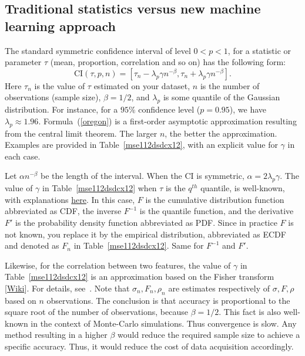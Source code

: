 \documentclass[oneside,10pt]{book}
\begin{document}
\subsection{Traditional statistics versus new machine learning approach}\label{excetp09}

The standard symmetric confidence interval of level $0<p<1$, for a statistic or parameter $\tau$ (mean, proportion, correlation and so on) has the following form:
\begin{equation}
\text{CI}(\tau, p, n) = [\tau_n - \lambda_p \gamma n^{-\beta},  \tau_n + \lambda_p \gamma n^{-\beta}].\label{oregon}
\end{equation}
Here $\tau_n$ is the value of $\tau$ estimated on your dataset, $n$ is the number of observations (sample size),
$\beta = 1/2$, and $\lambda_p$ is some quantile of the Gaussian distribution. For instance, for a $95\%$ confidence level ($p=0.95$),
 we have $\lambda_p \approx 1.96$. Formula~(\ref{oregon}) is a first-order 
\textcolor{index}{asymptotic approximation} resulting from the
 \textcolor{index}{central limit theorem}. The larger $n$, the better the approximation.
 Examples are provided in Table~\ref{mse112dsdcx12}, with an explicit value for $\gamma$ in each case.

Let $\alpha n^{-\beta}$ be the length of the interval. 
When the CI is symmetric, $\alpha = 2\lambda_p \gamma$.
 The value of $\gamma$ in 
 Table~\ref{mse112dsdcx12} when $\tau$ is the
 $q^{th}$ quantile, is well-known, with explanations \href{https://stats.stackexchange.com/questions/99829/how-to-obtain-a-confidence-interval-for-a-percentile}{here}.  
In this case, $F$ is the 
\textcolor{index}{cumulative distribution function} abbreviated as CDF, the inverse $F^{-1}$ is the \textcolor{index}{quantile function}, and the derivative $F'$ is the \textcolor{index}{probability density function} abbreviated as PDF.
 Since in practice $F$ is not known, you replace it by the \textcolor{index}{empirical distribution}, abbreviated as ECDF and denoted as $F_n$ in Table~\ref{mse112dsdcx12}. Same for $F^{-1}$ and $F'$.

Likewise, for the correlation between two features, the value of $\gamma$ in Table~\ref{mse112dsdcx12}
 is an approximation based on the \textcolor{index}{Fisher transform} [\href{https://en.wikipedia.org/wiki/Fisher_transformation}{Wiki}].
 For details, see~\cite{b18psy}. Note that $\sigma_n, F_n, \rho_n$ are estimates respectively of $\sigma, F, \rho$ based on $n$ observations.
 The conclusion is that accuracy is proportional to the square root of the number of observations, because $\beta = 1/2$. This fact is also well-known in the context of Monte-Carlo simulations. Thus convergence is slow. Any method resulting in a higher $\beta$ would reduce the required sample size to achieve a specific
 accuracy. Thus, it would reduce the cost of data acquisition accordingly.
\end{document}
